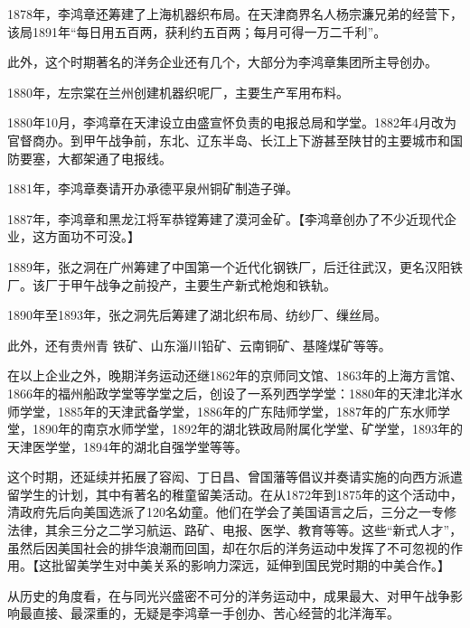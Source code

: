 \documentclass[10pt,a4paper]{beamer} %
\begin{document}
	\begin{frame}
		1878年，李鸿章还筹建了上海机器织布局。在天津商界名人杨宗濂兄弟的经营下，该局1891年“每日用五百两，获利约五百两；每月可得一万二千利”。
		
		此外，这个时期著名的洋务企业还有几个，大部分为李鸿章集团所主导创办。
		
		1880年，左宗棠在兰州创建机器织呢厂，主要生产军用布料。
		
		1880年10月，李鸿章在天津设立由盛宣怀负责的电报总局和学堂。1882年4月改为官督商办。到甲午战争前，东北、辽东半岛、长江上下游甚至陕甘的主要城市和国防要塞，大都架通了电报线。
		
		1881年，李鸿章奏请开办承德平泉州铜矿制造子弹。
		
		1887年，李鸿章和黑龙江将军恭镗筹建了漠河金矿。【李鸿章创办了不少近现代企业，这方面功不可没。】
		
		1889年，张之洞在广州筹建了中国第一个近代化钢铁厂，后迁往武汉，更名汉阳铁厂。该厂于甲午战争之前投产，主要生产新式枪炮和铁轨。
		
		1890年至1893年，张之洞先后筹建了湖北织布局、纺纱厂、缫丝局。
		
		此外，还有贵州青 铁矿、山东淄川铅矿、云南铜矿、基隆煤矿等等。
		
		在以上企业之外，晚期洋务运动还继1862年的京师同文馆、1863年的上海方言馆、1866年的福州船政学堂等学堂之后，创设了一系列西学学堂：1880年的天津北洋水师学堂，1885年的天津武备学堂，1886年的广东陆师学堂，1887年的广东水师学堂，1890年的南京水师学堂，1892年的湖北铁政局附属化学堂、矿学堂，1893年的天津医学堂，1894年的湖北自强学堂等等。
		
		这个时期，还延续并拓展了容闳、丁日昌、曾国藩等倡议并奏请实施的向西方派遣留学生的计划，其中有著名的稚童留美活动。在从1872年到1875年的这个活动中，清政府先后向美国选派了120名幼童。他们在学会了美国语言之后，三分之一专修法律，其余三分之二学习航运、路矿、电报、医学、教育等等。这些“新式人才”，虽然后因美国社会的排华浪潮而回国，却在尔后的洋务运动中发挥了不可忽视的作用。【这批留美学生对中美关系的影响力深远，延伸到国民党时期的中美合作。】
		
		从历史的角度看，在与同光兴盛密不可分的洋务运动中，成果最大、对甲午战争影响最直接、最深重的，无疑是李鸿章一手创办、苦心经营的北洋海军。
	\end{frame}
\end{document}
